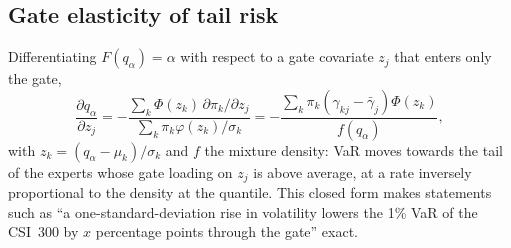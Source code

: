 \subsection{Gate elasticity of tail risk}
Differentiating $F(q_\alpha)=\alpha$ with respect to a gate covariate $z_j$ that enters only the gate,
\[
\frac{\partial q_\alpha}{\partial z_j}=-\frac{\sum_k\Phi(z_{k})\,\partial\pi_k/\partial z_j}{\sum_k\pi_k\varphi(z_k)/\sigma_k}
=-\frac{\sum_k\pi_k(\gamma_{kj}-\bar\gamma_j)\Phi(z_k)}{f(q_\alpha)},
\]
with $z_k=(q_\alpha-\mu_k)/\sigma_k$ and $f$ the mixture density: VaR moves towards the tail of the
experts whose gate loading on $z_j$ is above average, at a rate inversely proportional to the density
at the quantile. This closed form makes statements such as ``a one-standard-deviation rise in
volatility lowers the 1\% VaR of the CSI~300 by $x$ percentage points through the gate'' exact.
